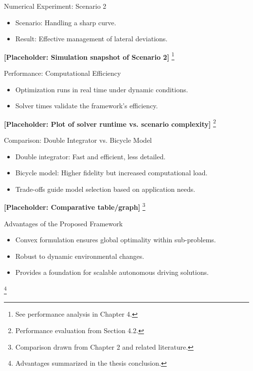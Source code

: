 \documentclass[shortpres,aspectratio=43]{beamer}
\newcommand\blfootnote[1]{%
  \begingroup
  \renewcommand\thefootnote{}\footnote{#1}%
  \addtocounter{footnote}{-1}%
  \endgroup
}
\begin{document}
\begin{frame}{Numerical Experiment: Scenario 2}
  \begin{itemize}
    \item Scenario: Handling a sharp curve.
    \item Result: Effective management of lateral deviations.
  \end{itemize}
  \centering
  \textbf{[Placeholder: Simulation snapshot of Scenario 2]}
  \blfootnote{\tiny See performance analysis in Chapter 4.}
\end{frame}

\begin{frame}{Performance: Computational Efficiency}
  \begin{itemize}
    \item Optimization runs in real time under dynamic conditions.
    \item Solver times validate the framework's efficiency.
  \end{itemize}
  \centering
  \textbf{[Placeholder: Plot of solver runtime vs. scenario complexity]}
  \blfootnote{\tiny Performance evaluation from Section 4.2.}
\end{frame}

\begin{frame}{Comparison: Double Integrator vs. Bicycle Model}
  \begin{itemize}
    \item Double integrator: Fast and efficient, less detailed.
    \item Bicycle model: Higher fidelity but increased computational load.
    \item Trade-offs guide model selection based on application needs.
  \end{itemize}
  \centering
  \textbf{[Placeholder: Comparative table/graph]}
  \blfootnote{\tiny Comparison drawn from Chapter 2 and related literature.}
\end{frame}

\begin{frame}{Advantages of the Proposed Framework}
  \begin{itemize}
    \item Convex formulation ensures global optimality within sub-problems.
    \item Robust to dynamic environmental changes.
    \item Provides a foundation for scalable autonomous driving solutions.
  \end{itemize}
  \blfootnote{\tiny Advantages summarized in the thesis conclusion.}
\end{frame}
\end{document}
